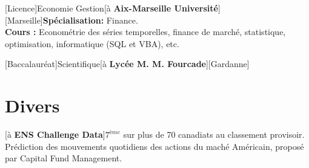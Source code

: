 \documentclass[a4paper]{arthur-cv}
\begin{document}
\begin{textblock}{20.5}
\begin{minipage}[t]{0.61\textwidth}
\begin{rightenv}
        [Licence]{Economie Gestion}[à \textbf{Aix-Marseille Université}][Marseille]{\textbf{Spécialisation:} Finance.\\\textbf{Cours :} Econométrie des séries temporelles, finance de marché, statistique, optimisation, informatique (SQL et VBA), etc.}

        [Baccalauréat]{Scientifique}[à \textbf{Lycée M. M. Fourcade}][Gardanne]{}
      \end{rightenv}

    \section{Divers}
      \begin{rightenv}
        [à \textbf{ENS Challenge Data}]{$7^{ème}$ sur plus de 70 canadiats au classement provisoir. Prédiction des mouvements quotidiens des actions du maché Américain, proposé par Capital Fund Management.}


      \end{rightenv}

  \end{minipage}

\end{textblock}
\end{document}
